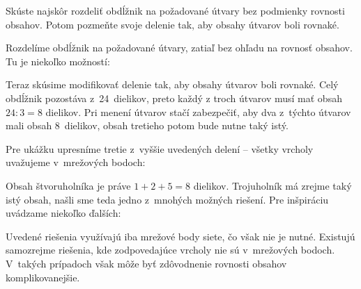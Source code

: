 {%
\napad
Skúste najskôr rozdeliť obdĺžnik na požadované útvary bez podmienky
rovnosti obsahov. Potom pozmeňte svoje delenie tak, aby obsahy útvarov
boli rovnaké.

\riesenie
Rozdelíme obdĺžnik na požadované útvary, zatiaľ bez ohľadu na rovnosť obsahov.
Tu je niekoľko možností:
%

Teraz skúsime modifikovať delenie tak, aby obsahy útvarov boli rovnaké.
Celý obdĺžnik pozostáva z~24~dielikov, preto každý z troch útvarov musí mať obsah
$24:3=8$ dielikov.
Pri menení útvarov stačí zabezpečiť, aby dva z~týchto útvarov mali
obsah 8~dielikov, obsah tretieho potom bude nutne taký istý.

Pre ukážku upresníme tretie z~vyššie uvedených delení
-- všetky vrcholy uvažujeme v~mrežových bodoch:
%

Obsah štvoruholníka je práve $1+2+5=8$ dielikov.
Trojuholník má zrejme taký istý obsah, našli sme teda jedno z~mnohých možných
riešení.
Pre inšpiráciu uvádzame niekoľko ďalších:
%

\poznamka
Uvedené riešenia využívajú iba mrežové body siete, čo však nie je nutné.
Existujú samozrejme riešenia, kde zodpovedajúce vrcholy nie sú v~mrežových
bodoch.
V~takých prípadoch však môže byť zdôvodnenie rovnosti obsahov
komplikovanejšie.
}

